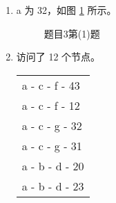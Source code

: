     \begin{solution}
        \begin{enumerate}
            \item a 为 32，如图 \ref{fig:p301} 所示。
            \begin{figure}[H]
                \centering
                
                \caption{题目3第(1)题}\label{fig:p301}
            \end{figure}
            \item 访问了 12 个节点。
            
            \begin{tabular}{l}
                \toprule
                a - c - f - 43 \\
                a - c - f - 12 \\
                a - c - g - 32 \\
                a - c - g - 31 \\
                a - b - d - 20 \\
                a - b - d - 23 \\
                \bottomrule
            \end{tabular}
        \end{enumerate}
    \end{solution}

